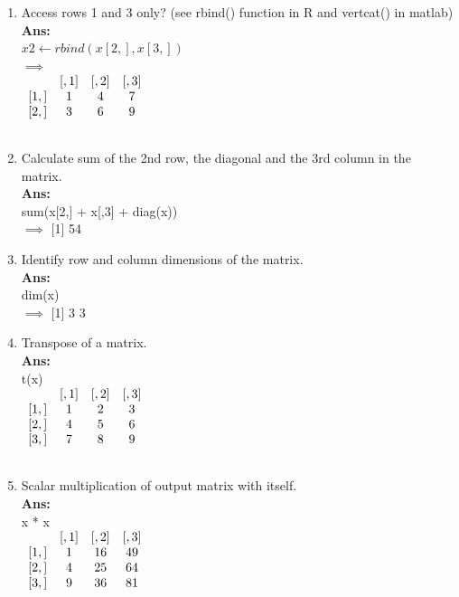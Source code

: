 \documentclass[fontsize=10pt]{scrartcl}
\begin{document}
\begin{enumerate}
\begin{enumerate}
				\item
				Access rows 1 and 3 only? (see rbind() function in R and vertcat() in matlab) \\
				\textbf{Ans:} \\
				$x2 \leftarrow rbind(x[2,],x[3,])$ \\
				$\implies$ \\
				$\begin{array}{cccc}
					~		&	[,1]	&	[,2]	&	[,3]	\\ \relax
					[1,]	&	1		&	4		&	7		\\ \relax
					[2,]	&	3		&	6		&	9		\\ \relax
				\end{array}$

				\item
				Calculate sum of the 2nd row, the diagonal and the 3rd column in the matrix. \\
				\textbf{Ans:} \\
				sum(x[2,] + x[,3] + diag(x)) \\
				$\implies$  [1] 54 \\

				\item
				Identify row and column dimensions of the matrix.\\
				\textbf{Ans:} \\
				dim(x) \\
				$\implies$ [1] 3 3 \\

				\item
				Transpose of a matrix. \\
				\textbf{Ans:} \\
				t(x) \\
				$\begin{array}{cccc}
				~		&	[,1]	&	[,2]	&	[,3]	\\ \relax
				[1,]	&	1		&	2		&	3		\\ \relax
				[2,]	&	4		&	5		&	6		\\ \relax
				[3,]	&	7		&	8		&	9		\\ \relax
				\end{array}$

				\item
				Scalar multiplication of output matrix with itself. \\
				\textbf{Ans:} \\
				x * x \\
				$\begin{array}{cccc}
				~		&	[,1]	&	[,2]	&	[,3]	\\ \relax
				[1,]	&	1		&	16		&	49		\\ \relax
				[2,]	&	4		&	25		&	64		\\ \relax
				[3,]	&	9		&	36		&	81		\\ \relax
				\end{array}$


\end{enumerate}
\end{enumerate}
\end{document}
